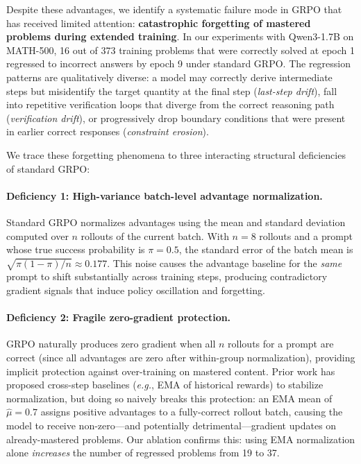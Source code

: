 \documentclass[11pt]{article}
\newcommand{\eg}{\textit{e.g.}}
\theoremstyle{definition}
\begin{document}
Despite these advantages, we identify a systematic failure mode in GRPO that
has received limited attention: \textbf{catastrophic forgetting of mastered
problems during extended training}.
In our experiments with Qwen3-1.7B on MATH-500, 16 out of 373 training
problems that were correctly solved at epoch 1 regressed to incorrect answers
by epoch 9 under standard GRPO.
The regression patterns are qualitatively diverse: a model may correctly
derive intermediate steps but misidentify the target quantity at the final
step (\emph{last-step drift}), fall into repetitive verification loops that
diverge from the correct reasoning path (\emph{verification drift}), or
progressively drop boundary conditions that were present in earlier correct
responses (\emph{constraint erosion}).

We trace these forgetting phenomena to three interacting structural
deficiencies of standard GRPO:

\paragraph{Deficiency 1: High-variance batch-level advantage normalization.}
Standard GRPO normalizes advantages using the mean and standard deviation
computed over $n$ rollouts of the current batch.
With $n=8$ rollouts and a prompt whose true success probability is $\pi=0.5$,
the standard error of the batch mean is $\sqrt{\pi(1-\pi)/n} \approx 0.177$.
This noise causes the advantage baseline for the \emph{same} prompt to shift
substantially across training steps, producing contradictory gradient signals
that induce policy oscillation and forgetting.

\paragraph{Deficiency 2: Fragile zero-gradient protection.}
GRPO naturally produces zero gradient when all $n$ rollouts for a prompt are
correct (since all advantages are zero after within-group normalization),
providing implicit protection against over-training on mastered content.
Prior work has proposed cross-step baselines (\eg, EMA of historical rewards)
to stabilize normalization, but doing so naively breaks this protection:
an EMA mean of $\hat{\mu}=0.7$ assigns positive advantages to a fully-correct
rollout batch, causing the model to receive non-zero—and potentially
detrimental—gradient updates on already-mastered problems.
Our ablation confirms this: using EMA normalization alone \emph{increases}
the number of regressed problems from 19 to 37.
\end{document}
